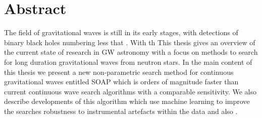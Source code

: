 \chapter{Abstract}

The field of gravitational waves is still in its early stages, with detections of binary black holes numbering less that .
With th 
This thesis gives an overview of the current state of research in \gls{GW} astronomy with a focus on methods to search for long duration gravitational waves from neutron stars. In the main content of this thesis we present a new non-parametric search method for continuous gravitational waves entitled SOAP which is orders of magnitude faster than current continuous wave search algorithms with a comparable sensitivity.
We also describe developments of this algorithm which use machine learning to improve the searches robustness to instrumental artefacts within the data and also . 

